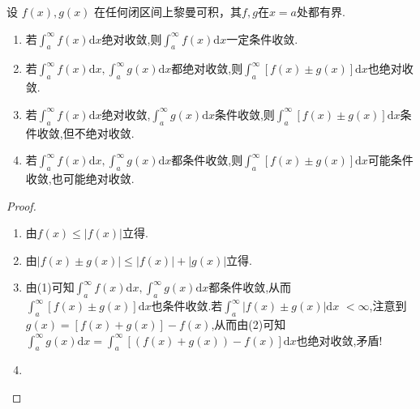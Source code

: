 \documentclass[../../main.tex]{subfiles}%
\begin{document}
\begin{proposition}\label{proposition:反常积分敛散性运算性质}
设 \(f(x),g(x)\) 在任何闭区间上黎曼可积，其$f,g$在$x=a$处都有界.
\begin{enumerate}[(1)]
\item 若$\int_a^{\infty}{f\left( x \right) \mathrm{d}x}$绝对收敛,则$\int_a^{\infty}{f\left( x \right) \mathrm{d}x}$一定条件收敛.

\item 若$\int_a^{\infty}{f\left( x \right) \mathrm{d}x},
\int_a^{\infty}{g\left( x \right) \mathrm{d}x}$都绝对收敛,则$\int_a^{\infty}{\left[ f\left( x \right) \pm g\left( x \right) \right] \mathrm{d}x}$也绝对收敛.

\item 若$\int_a^{\infty}{f\left( x \right) \mathrm{d}x}$绝对收敛,$
\int_a^{\infty}{g\left( x \right) \mathrm{d}x}$条件收敛,则$\int_a^{\infty}{\left[ f\left( x \right) \pm g\left( x \right) \right] \mathrm{d}x}$条件收敛,但不绝对收敛.

\item 若$\int_a^{\infty}{f\left( x \right) \mathrm{d}x},
\int_a^{\infty}{g\left( x \right) \mathrm{d}x}$都条件收敛,则$\int_a^{\infty}{\left[ f\left( x \right) \pm g\left( x \right) \right] \mathrm{d}x}$可能条件收敛,也可能绝对收敛.
\end{enumerate}
\end{proposition}
\begin{proof}
\begin{enumerate}[(1)]
\item 由$f(x)\leqslant  |f(x)|$立得.

\item 由$|f(x)\pm g(x)|\leqslant  |f(x)|+|g(x)|$立得.

\item 由(1)可知$\int_a^{\infty}{f\left( x \right) \mathrm{d}x},
\int_a^{\infty}{g\left( x \right) \mathrm{d}x}$都条件收敛,从而$\int_a^{\infty}{\left[ f\left( x \right) \pm g\left( x \right) \right] \mathrm{d}x}$也条件收敛.若$\int_a^{\infty}{\left| f\left( x \right) \pm g\left( x \right) \right|\mathrm{d}x}$ $<\infty$,注意到$g\left( x \right) =\left[ f\left( x \right) +g\left( x \right) \right] -f\left( x \right)$,从而由(2)可知$\int_a^{\infty}{g\left( x \right) \mathrm{d}x}=\int_a^{\infty}{\left[ \left( f\left( x \right) +g\left( x \right) \right) -f\left( x \right) \right] \mathrm{d}x}$也绝对收敛,矛盾!

\item 
\end{enumerate}
\end{proof}
\end{document}
